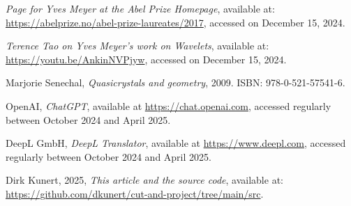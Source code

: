 \documentclass[11pt]{article}
\theoremstyle{remark}
\begin{document}
\begin{thebibliography}{99}

\emph{Page for Yves Meyer at the Abel Prize Homepage},
available at: \url{https://abelprize.no/abel-prize-laureates/2017}, accessed on December 15, 2024.

\emph{Terence Tao on Yves Meyer's work on Wavelets},
available at: \url{https://youtu.be/AnkinNVPjyw}, accessed on December 15, 2024.

Marjorie Senechal,
\emph{Quasicrystals and geometry},
2009.
ISBN: 978-0-521-57541-6.

OpenAI, \emph{ChatGPT}, available at \url{https://chat.openai.com}, accessed regularly between October 2024 and April 2025.

DeepL GmbH, \emph{DeepL Translator}, available at \url{https://www.deepl.com}, accessed regularly between October 2024 and April 2025.

Dirk Kunert, 2025,
\emph{This article and the source code},
available at: \url{https://github.com/dkunert/cut-and-project/tree/main/src}.

\end{thebibliography}
\end{document}
